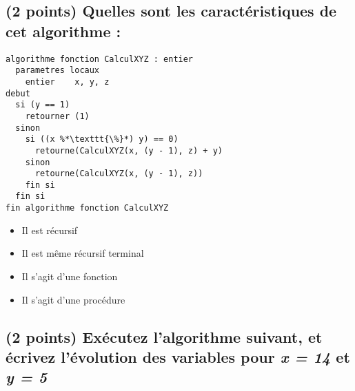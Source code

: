 \documentclass[11pt,a4paper]{article}
\begin{document}


\subsection{(2 points) Quelles sont les caractéristiques de cet algorithme : }

\bigskip

\begin{lstlisting}[style=algorithmique]
algorithme fonction CalculXYZ : entier
  parametres locaux
    entier    x, y, z
debut
  si (y == 1)
    retourner (1)
  sinon
    si ((x %*\texttt{\%}*) y) == 0)
      retourne(CalculXYZ(x, (y - 1), z) + y)
    sinon
      retourne(CalculXYZ(x, (y - 1), z))
    fin si
  fin si
fin algorithme fonction CalculXYZ \end{lstlisting}

\begin{itemize}
  \item[\CaseCoche] Il est récursif \\
  \item[\CaseCoche] Il est même récursif terminal \\
  \item[\CaseCoche] Il s'agit d'une fonction \\
  \item[\CaseCoche] Il s'agit d'une procédure \\
\end{itemize}


\newpage
\vfillFirst


\subsection{(2 points) Exécutez l'algorithme suivant, et écrivez l'évolution des variables pour \textit{x = 14} et \textit{y = 5} }

\end{document}
